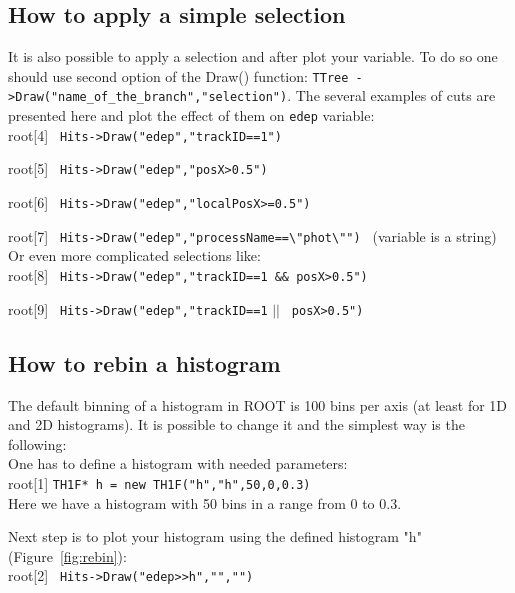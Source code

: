 \documentclass[12pt]{article}
\begin{document}
\clearpage
\subsection{How to apply a simple selection}
It is also possible to apply a selection and after plot your variable. To do so one should use second option of the Draw() function: \verb|TTree ->Draw("name_of_the_branch","selection")|. The several examples of cuts are presented here and plot the effect of them on \verb|edep| variable:\\

root[4] \verb| Hits->Draw("edep","trackID==1") |

root[5] \verb| Hits->Draw("edep","posX>0.5") |

root[6] \verb| Hits->Draw("edep","localPosX>=0.5") |

root[7] \verb| Hits->Draw("edep","processName==\"phot\"") | (variable is a string)\\

Or even more complicated selections like: \\

root[8] \verb| Hits->Draw("edep","trackID==1 && posX>0.5") |

root[9] \verb| Hits->Draw("edep","trackID==1| $||$ \verb| posX>0.5") |\\

\subsection{How to rebin a histogram}
The default binning of a histogram in ROOT is 100 bins per axis (at least for 1D and 2D histograms). It is possible to change it and the simplest way is the following:\\
One has to define a histogram with needed parameters:\\

root[1] \verb|TH1F* h = new TH1F("h","h",50,0,0.3) |\\

Here  we have a histogram with 50 bins in a range from 0 to 0.3.

Next step is to plot your histogram using the defined histogram "h" (Figure~\ref{fig:rebin}): \\

root[2] \verb| Hits->Draw("edep>>h","","") |
\end{document}
